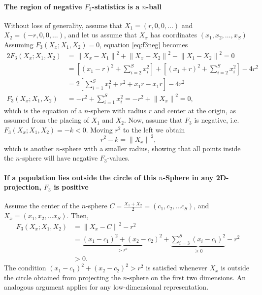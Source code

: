 \documentclass[12pt,fullpage, a4paper]{article}
\newcommand{\normsq}[1]{\left\lVert#1\right\rVert^2}
\begin{document}
\paragraph{The region of negative $F_3$-statistics is a $n$-ball}
Without loss of generality, assume that $X_1 = (r, 0, 0, \dots)$ and $X_2 = (-r, 0, 0, \dots)$, and let us assume that $X_x$ has coordinates $(x_1, x_2, \dots, x_S)$ Assuming $F_3(X_x; X_1, X_2) = 0$, equation \ref{eq:f3neg} becomes
\begin{align}
2 F_3(X_x; X_1, X_2) &=  \normsq{X_x - X_1} + \normsq{X_x - X_2}  - \normsq{X_1 - X_2} = 0 \nonumber\\
&= \left[(x_1-r)^2 + \sum_{i=2}^S x_i^2\right] + \left[(x_1 + r)^2 + \sum_{i=2}^S x_i^2\right] - 4r^2 \nonumber\\
&= 2 \left[\sum_{i=1}^S x_i^2 + r^2 + x_1r - x_1r\right] - 4r^2\nonumber\\
F_3(X_x; X_1, X_2) & = -r^2 + \sum_{i=1}^S x_i^2 = -r^2 + \normsq{X_x} = 0  \text{,} \label{eq:f3sphere}
\end{align}
which is the equation of a $n$-sphere with radius $r$ and center at the origin, as assumed from the placing of $X_1$ and $X_2$. Now, assume that $F_3$ is negative, i.e. $F_3(X_x; X_1, X_2) = -k < 0$. Moving $r^2$ to the left we obtain
\begin{equation}
r^2 - k = \normsq{X_x} \text{,}
\end{equation}
which is another $n$-sphere with a smaller radius, showing that all points inside the $n$-sphere will have negative $F_3$-values.

\paragraph{If a population lies outside the circle of this $n$-Sphere in any 2D-projection, $F_3$ is positive} 
Assume the center of the $n$-sphere $C = \frac{X_1 + X_2}{2} = (c_1, c_2, \dots c_S)$, and $X_x = (x_1, x_2, \dots x_S)$.  Then, 
\begin{align}
F_3(X_x; X_1, X_2) &= \normsq{X_x - C} - r^2 \nonumber\\
&= \underbrace{(x_1 - c_1)^2 + (x_2 - c_2)^2}_{>r^2} + \underbrace{\sum_{i=3}^S (x_i - c_i)^2}_{\geq 0} - r^2 \nonumber\\
& > 0 \text{.}\label{eq:f3circle}
\end{align}
The condition $(x_1 - c_1)^2 + (x_2 - c_2)^2 >r^2$ is satisfied whenever $X_x$ is outside the circle obtained from projecting the $n$-sphere on the first two dimensions. An analogous argument applies for any low-dimensional representation.
\end{document}
